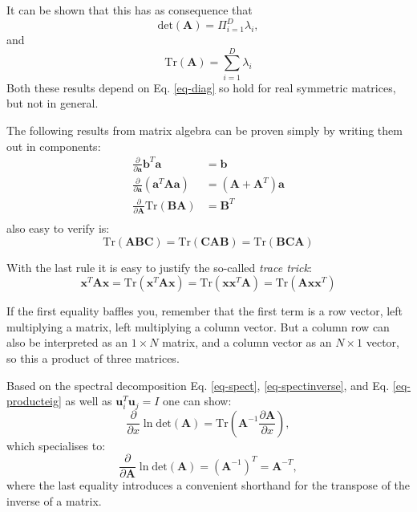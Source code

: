   It can be shown that this has as consequence that
  \begin{equation}
    \mbox{det}(\boldsymbol{A}) = \Pi^D_{i=1} \lambda_i,
    \label{eq-producteig}
  \end{equation}
  and
  \begin{equation}
    \mbox{Tr}(\boldsymbol{A}) = \sum^D_{i=1} \lambda_i
  \end{equation}
  Both these results depend on Eq. \ref{eq-diag} so hold for real symmetric matrices, but not in general.

  The following results from matrix algebra can be proven simply by writing them out in components:
  \begin{align}
    \frac{\partial }{\partial  \boldsymbol{a}}\boldsymbol{b}^T \boldsymbol{a} & = \boldsymbol{b}  \\
    \frac{\partial}{\partial \boldsymbol{a}}(\boldsymbol{a}^T \boldsymbol{A} \boldsymbol{a}) &  = (\boldsymbol{A} + \boldsymbol{A}^T)\boldsymbol{a} \label{eq-tp} \\
    \frac{\partial}{\partial \boldsymbol{A}}\mbox{Tr}(\boldsymbol{B} \boldsymbol{A}) & = \boldsymbol{B}^T   \\
  \end{align}
  also easy to verify is:
  \begin{equation}
    \mbox{Tr}(\boldsymbol{A} \boldsymbol{B} \boldsymbol{C}) =     \mbox{Tr}(\boldsymbol{C} \boldsymbol{A} \boldsymbol{B}) =     \mbox{Tr}(\boldsymbol{B} \boldsymbol{C} \boldsymbol{A}) 
    \end{equation}
   
    
    With the last rule it is easy to justify the so-called \emph{trace trick}:
    \begin{equation}
      \boldsymbol{x}^T \boldsymbol{A} \boldsymbol{x} = \mbox{Tr}( \boldsymbol{x}^T \boldsymbol{A} \boldsymbol{x} ) = \mbox{Tr}( \boldsymbol{x} \boldsymbol{x}^T \boldsymbol{A} ) =\mbox{Tr}( \boldsymbol{A} \boldsymbol{x} \boldsymbol{x}^T )
    \end{equation}

    If the first equality baffles you, remember that the first term is a row vector, left multiplying a matrix, left multiplying a column vector. But a column row can also
    be interpreted as an $1 \times N$ matrix, and a column vector as an $N \times 1$ vector, so this a product of three matrices.

    Based on the spectral decomposition Eq. \ref{eq-spect}, \ref{eq-spectinverse}, and Eq. \ref{eq-producteig} as well as $\boldsymbol{u}^T_i \boldsymbol{u}_j  = I$ one can show:
    $$
      \frac{\partial}{\partial x} \ln \mbox{det}(\boldsymbol{A}) = \mbox{Tr} \left( \boldsymbol{A}^{-1}   \frac{\partial \boldsymbol{A}}{\partial x} \right),
    $$
    which specialises to:
    \begin{equation}
      \frac{\partial}{\partial \boldsymbol{A}} \ln \mbox{det}(\boldsymbol{A}) = ( \boldsymbol{A}^{-1})^T = \boldsymbol{A}^{-T},
    \end{equation}
    where the last equality introduces a convenient shorthand for the transpose of the inverse of a matrix.


